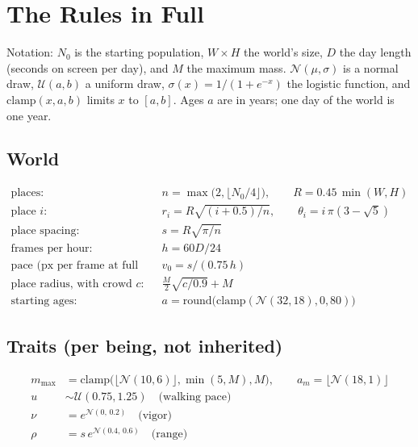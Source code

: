 \section{The Rules in Full}
\label{app:rules}

Notation: $N_0$ is the starting population, $W \times H$ the world's size, $D$ the day length (seconds on screen per day), and $M$ the maximum mass. $\mathcal{N}(\mu, \sigma)$ is a normal draw, $\mathcal{U}(a, b)$ a uniform draw, $\sigma(x) = 1/(1+e^{-x})$ the logistic function, and $\mathrm{clamp}(x, a, b)$ limits $x$ to $[a, b]$. Ages $a$ are in years; one day of the world is one year.

\subsection*{World}
\begin{align*}
  \text{places:}\quad & n = \max\!\big(2, \lfloor N_0/4 \rfloor\big), \qquad R = 0.45\,\min(W, H) \\
  \text{place } i:\quad & r_i = R\sqrt{(i + 0.5)/n}, \qquad \theta_i = i\,\pi(3 - \sqrt{5}) \\
  \text{place spacing:}\quad & s = R\sqrt{\pi / n} \\
  \text{frames per hour:}\quad & h = 60D / 24 \\
  \text{pace (px per frame at full energy):}\quad & v_0 = s / (0.75\,h) \\
  \text{place radius, with crowd } c:\quad & \tfrac{M}{2}\sqrt{c/0.9} + M \\
  \text{starting ages:}\quad & a = \mathrm{round}\big(\mathrm{clamp}(\mathcal{N}(32, 18), 0, 80)\big)
\end{align*}

\subsection*{Traits (per being, not inherited)}
\begin{align*}
  m_{\max} &= \mathrm{clamp}\big(\lfloor \mathcal{N}(10, 6) \rfloor, \min(5, M), M\big), \qquad a_m = \lfloor \mathcal{N}(18, 1) \rfloor \\
  u &\sim \mathcal{U}(0.75, 1.25) \quad \text{(walking pace)} \\
  \nu &= e^{\mathcal{N}(0,\, 0.2)} \quad \text{(vigor)} \\
  \rho &= s\, e^{\mathcal{N}(0.4,\, 0.6)} \quad \text{(range)}
\end{align*}

